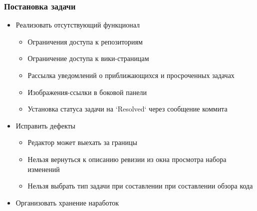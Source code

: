 \documentclass[unicode]{beamer}
\begin{document}
\begin{frame}
\transwipe[direction=90]
\frametitle{Постановка задачи}
\begin{block}{}
\begin{itemize}
  \item Реализовать отсутствующий функционал
  \begin{itemize}
    \item Ограничения доступа к репозиториям
    \item Ограничение доступа к вики-страницам
    \item Рассылка уведомлений о приближающихся и просроченных задачах
    \item Изображения-ссылки в боковой панели
    \item Установка статуса задачи на `Resolved` через сообщение коммита
  \end{itemize}
  \item Исправить дефекты
  \begin{itemize}
    \item Редактор может выехать за границы
    \item Нельзя вернуться к описанию ревизии из окна просмотра набора изменений
    \item Нельзя выбрать тип задачи при составлении при составлении обзора кода
  \end{itemize}
  \item Организовать хранение наработок
\end{itemize}
\end{block}
\end{frame}
\end{document}
